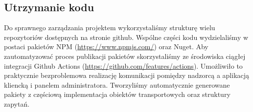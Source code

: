 \documentclass[../opis-rozwiazania.tex]{subfiles}
\begin{document}
\subsection{Utrzymanie kodu}
Do sprawnego zarządzania projektem wykorzystaliśmy strukturę wielu repozytoriów dostępnych na stronie github.
Wspólne części kodu wydzielaliśmy w postaci pakietów NPM (\url{https://www.npmjs.com/}) oraz Nuget.
Aby zautomatyzować proces publikacji pakietów skorzystaliśmy ze środowiska ciągłej integracji Github Actions (\url{https://github.com/features/actions}).
Umożliwiło to praktycznie bezproblemowa realizację komunikacji pomiędzy nadzorcą a aplikacją kliencką i panelem administratora.
Tworzyliśmy automatycznie generowane pakiety z częściową implementacja obiektów transportowych oraz struktury zapytań.
\end{document}
